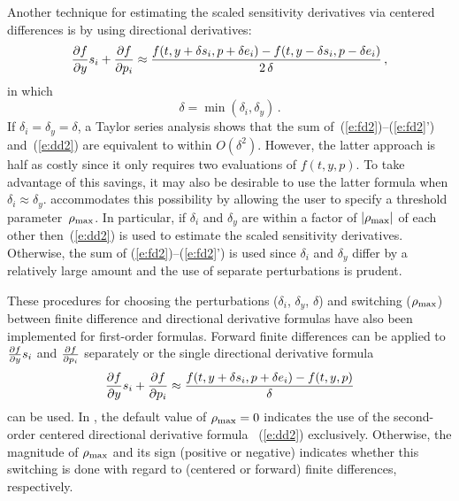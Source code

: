 Another technique for estimating the scaled sensitivity derivatives
via centered differences is by using directional derivatives:
\begin{equation}\label{e:dd2}
\frac{\partial f}{\partial y} s_i + \frac{\partial f}{\partial p_i} \approx
\frac{f(t, y+\delta s_i, p + \delta e_i)-
      f(t, y-\delta s_i, p - \delta e_i)}{2\,\delta} \, ,
\end{equation}
in which
\begin{equation*}
\delta = \min(\delta_i, \delta_y) \, .
\end{equation*}
If $\delta_i = \delta_y = \delta$, a Taylor series analysis shows
that the sum of~(\ref{e:fd2})--(\ref{e:fd2}')
and~(\ref{e:dd2}) are equivalent to within $O(\delta^2)$.
However, the latter approach is half as costly since it only requires
two evaluations of $f(t,y,p)$.  
To take advantage of this savings, it may also be desirable to use the
latter formula when $\delta_i \approx \delta_y$.
{\cvodes} accommodates this possibility by allowing the user to
specify a threshold parameter~$\rho_{\max}$.
In particular, if $\delta_i$ and $\delta_y$ are within a factor of
$|\rho_{\max}|$ of each other then~(\ref{e:dd2}) is used to estimate the
scaled sensitivity derivatives.
Otherwise, the sum of (\ref{e:fd2})--(\ref{e:fd2}') is used since
$\delta_i$ and $\delta_y$ differ by a relatively large amount and the
use of separate perturbations is prudent.

These procedures for choosing the perturbations ($\delta_i$,
$\delta_y$, $\delta$) and switching ($\rho_{\max}$) between
finite difference and directional derivative formulas have also been implemented 
for first-order formulas.
Forward finite differences can be applied to $\frac{\partial f}{\partial y} s_i$ and
$\frac{\partial f}{\partial p_i}$ separately or the single directional derivative formula
\begin{equation*}
\frac{\partial f}{\partial y} s_i + \frac{\partial f}{\partial p_i} \approx
\frac{f(t, y+\delta s_i, p + \delta e_i) - f(t, y, p)}{\delta}
\end{equation*}
can be used.
In {\cvodes}, the default value of $\rho_{\max}=0$ indicates the use of
the second-order centered directional derivative formula ~(\ref{e:dd2}) exclusively.
Otherwise, the magnitude of $\rho_{\max}$ and its sign (positive or
negative) indicates whether this switching is done with regard to
(centered or forward) finite differences, respectively.

